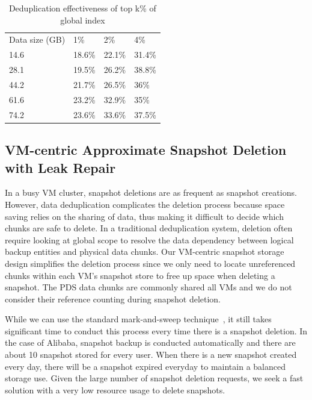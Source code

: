 {\begin{table}
    \begin{tabular}{llll}
    Data size (GB) & 1\%    & 2\%    & 4\%    \\
    14.6           & 18.6\% & 22.1\% & 31.4\% \\
    28.1           & 19.5\% & 26.2\% & 38.8\% \\
    44.2           & 21.7\% & 26.5\% & 36\%   \\
    61.6           & 23.2\% & 32.9\% & 35\%   \\
    74.2           & 23.6\% & 33.6\% & 37.5\% \\
    \end{tabular}
    \caption{Deduplication effectiveness of top k\% of global index}
    \label{tab:cds}
\end{table}

}

\subsection{ VM-centric Approximate Snapshot Deletion with Leak Repair}

In a busy VM cluster, snapshot deletions are as frequent as snapshot creations.
However, data deduplication complicates the deletion process because space saving relies on the sharing of data,
thus making it difficult to decide which chunks are safe to delete.
In a traditional deduplication system, deletion often require looking at global scope to
resolve the data dependency between logical backup entities and physical data chunks.
Our VM-centric snapshot storage design simplifies the deletion process since 
we only need to locate unreferenced chunks within each VM's snapshot store to free up space when deleting a snapshot.
The PDS data chunks are commonly shared all VMs and we do not consider their reference
counting during snapshot deletion.

While we can use the standard mark-and-sweep technique~\cite{mark-sweep}, 
it still takes significant time to conduct this process every time there is a snapshot deletion.
In the case of Alibaba, snapshot backup is conducted automatically and there are 
about 10 snapshot stored for every user. When there is
a new snapshot created every day,  there will be  a snapshot expired everyday to maintain
a balanced storage use. Given the large number of snapshot deletion requests, we seek
a fast solution with a very low resource usage to delete snapshots.

